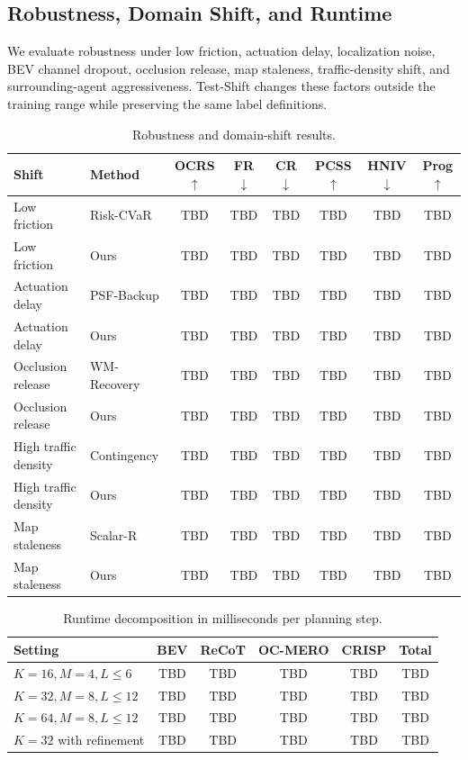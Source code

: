 \documentclass[conference]{IEEEtran}
\begin{document}
\subsection{Robustness, Domain Shift, and Runtime}
\label{subsec:robustness_runtime}

We evaluate robustness under low friction, actuation delay, localization noise, BEV channel dropout, occlusion release, map staleness, traffic-density shift, and surrounding-agent aggressiveness.  Test-Shift changes these factors outside the training range while preserving the same label definitions.

\begin{table}[t]
\centering
\footnotesize
\caption{Robustness and domain-shift results.}
\label{tab:robustness}
\begin{tabular}{llcccccc}
\toprule
Shift & Method & OCRS $\uparrow$ & FR $\downarrow$ & CR $\downarrow$ & PCSS $\uparrow$ & HNIV $\downarrow$ & Prog $\uparrow$ \\
\midrule
Low friction & Risk-CVaR & TBD & TBD & TBD & TBD & TBD & TBD \\
Low friction & Ours & TBD & TBD & TBD & TBD & TBD & TBD \\
Actuation delay & PSF-Backup & TBD & TBD & TBD & TBD & TBD & TBD \\
Actuation delay & Ours & TBD & TBD & TBD & TBD & TBD & TBD \\
Occlusion release & WM-Recovery & TBD & TBD & TBD & TBD & TBD & TBD \\
Occlusion release & Ours & TBD & TBD & TBD & TBD & TBD & TBD \\
High traffic density & Contingency & TBD & TBD & TBD & TBD & TBD & TBD \\
High traffic density & Ours & TBD & TBD & TBD & TBD & TBD & TBD \\
Map staleness & Scalar-R & TBD & TBD & TBD & TBD & TBD & TBD \\
Map staleness & Ours & TBD & TBD & TBD & TBD & TBD & TBD \\
\bottomrule
\end{tabular}
\end{table}

\begin{table}[t]
\centering
\caption{Runtime decomposition in milliseconds per planning step.}
\label{tab:runtime}
\begin{tabular}{lccccc}
\toprule
Setting & BEV & ReCoT & OC-MERO & CRISP & Total \\
\midrule
$K=16,M=4,L\le6$ & TBD & TBD & TBD & TBD & TBD \\
$K=32,M=8,L\le12$ & TBD & TBD & TBD & TBD & TBD \\
$K=64,M=8,L\le12$ & TBD & TBD & TBD & TBD & TBD \\
$K=32$ with refinement & TBD & TBD & TBD & TBD & TBD \\
\bottomrule
\end{tabular}
\end{table}
\end{document}
